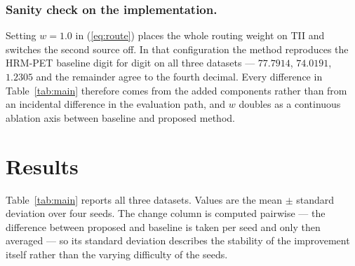 \documentclass[runningheads]{llncs}
\begin{document}
\subsubsection{Sanity check on the implementation.}
Setting $w = 1.0$ in (\ref{eq:route}) places the whole routing weight on TII and
switches the second source off. In that configuration the method reproduces the
HRM-PET baseline digit for digit on all three datasets --- $77.7914$, $74.0191$,
$1.2305$ and the remainder agree to the fourth decimal. Every difference in
Table~\ref{tab:main} therefore comes from the added components rather than from
an incidental difference in the evaluation path, and $w$ doubles as a continuous
ablation axis between baseline and proposed method.

\section{Results}
\label{sec:results}

Table~\ref{tab:main} reports all three datasets. Values are the mean $\pm$
standard deviation over four seeds. The change column is computed pairwise ---
the difference between proposed and baseline is taken per seed and only then
averaged --- so its standard deviation describes the stability of the
improvement itself rather than the varying difficulty of the seeds.
\end{document}
